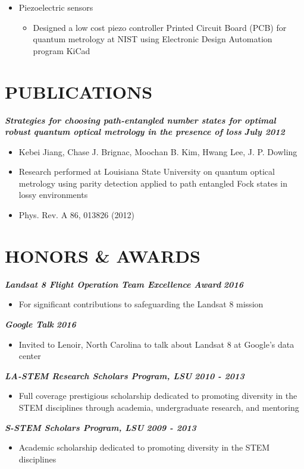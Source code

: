 \documentclass{res}
\begin{document}
\begin{resume}
\begin{itemize}
	 	\item Piezoelectric sensors
	 	\begin{itemize}
	 	\item Designed a low cost piezo controller Printed Circuit Board (PCB) for quantum metrology at NIST using Electronic Design Automation program KiCad
	 	\end{itemize}
	 	\end{itemize}	

\section{PUBLICATIONS}
	{\bfseries {\em Strategies for choosing path-entangled number states for optimal\\robust quantum optical metrology in the presence of loss}} \hfill  {\bfseries {\em July 2012}}
	 	\begin{itemize}  \itemsep -2pt %
		\item Kebei Jiang, Chase J. Brignac, Moochan B. Kim, Hwang Lee, J. P. Dowling
		\item Research performed at Louisiana State University on quantum optical metrology using parity detection applied to path entangled Fock states in lossy environments
		\item Phys. Rev. A 86, 013826 (2012)
		\end{itemize}

\section{HONORS \& AWARDS}
  	{\bfseries {\em Landsat 8 Flight Operation Team Excellence Award}} \hfill {\bfseries {\em 2016}} \
		\begin{itemize} \itemsep -2pt %
		\item For significant contributions to safeguarding the Landsat 8 mission
		\end{itemize}
	{\bfseries {\em Google Talk}} \hfill {\bfseries {\em 2016}} \
		\begin{itemize} \itemsep -2pt %
		\item Invited to Lenoir, North Carolina to talk about Landsat 8 at Google's data center
		\end{itemize}
  	{\bfseries {\em LA-STEM Research Scholars Program, LSU}} \hfill {\bfseries {\em 2010 - 2013}} \
		\begin{itemize} \itemsep -2pt %
		\item Full coverage prestigious scholarship dedicated to promoting diversity in the STEM disciplines through academia, undergraduate research, and mentoring
		\end{itemize}
	{\bfseries {\em S-STEM Scholars Program, LSU}} \hfill {\bfseries {\em 2009 - 2013}} \
		\begin{itemize} \itemsep -2pt %
		\item Academic scholarship dedicated to promoting diversity in the STEM disciplines
		\end{itemize}


\end{resume}
\end{document}
